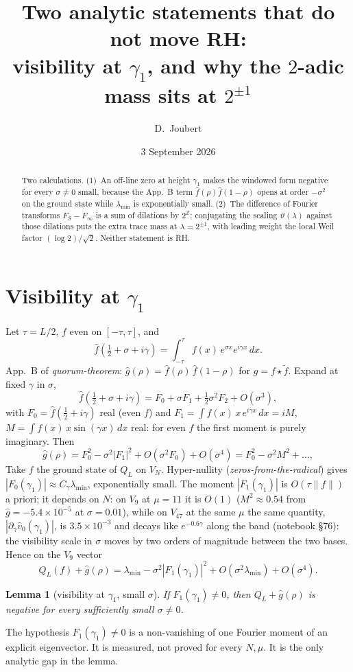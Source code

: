 \documentclass[11pt]{article}
\title{Two analytic statements that do not move RH:\\
\large visibility at $\gamma_1$, and why the $2$-adic mass sits at $2^{\pm1}$}
\author{D.\ Joubert}
\date{3 September 2026}
\newtheorem{lemma}{Lemma}
\theoremstyle{remark}\newtheorem*{remark}{Remark}
\begin{document}
\maketitle
\begin{abstract}
\noindent
Two calculations. (1)~An off-line zero at height $\gamma_1$ makes the
windowed form negative for every $\sigma\neq0$ small, because the
App.~B term $\hat f(\rho)\hat f(1-\rho)$ opens at order $-\sigma^2$
on the ground state while $\lambda_{\min}$ is exponentially small.
(2)~The difference of Fourier transforms $F_S-F_\infty$ is a sum of
dilations by $2^{\mathbb Z}$; conjugating the scaling $\vartheta(\lambda)$
against those dilations puts the extra trace mass at $\lambda=2^{\pm1}$,
with leading weight the local Weil factor $(\log2)/\sqrt2$. Neither
statement is RH.
\end{abstract}

\section{Visibility at $\gamma_1$}
Let $\tau=L/2$, $f$ even on $[-\tau,\tau]$, and
\[
\hat f(\tfrac12+\sigma+i\gamma)=\int_{-\tau}^{\tau}f(x)\,e^{\sigma x}e^{i\gamma x}\,dx.
\]
App.~B of \emph{quorum-theorem}: $\hat g(\rho)=\hat f(\rho)\,\hat f(1-\rho)$
for $g=f\star\tilde f$. Expand at fixed $\gamma$ in $\sigma$,
\[
\hat f(\tfrac12+\sigma+i\gamma)=F_0+\sigma F_1+\tfrac12\sigma^2 F_2+O(\sigma^3),
\]
with $F_0=\hat f(\tfrac12+i\gamma)$ real (even $f$) and $F_1=\int f(x)\,x\,e^{i\gamma x}\,dx=iM$, $M=\int f(x)\,x\sin(\gamma x)\,dx$ real: for even $f$ the first moment is purely imaginary.
Then
\[
\hat g(\rho)=F_0^2-\sigma^2 |F_1|^2+O(\sigma^2 F_0)+O(\sigma^4)=F_0^2-\sigma^2M^2+\ldots,
\]
Take $f$ the ground state of $Q_L$ on $V_N$. Hyper-nullity
(\emph{zeros-from-the-radical}) gives $|F_0(\gamma_1)|\approx C_\gamma\lambda_{\min}$,
exponentially small. The moment $|F_1(\gamma_1)|$ is $O(\tau\|f\|)$ a priori; it depends on $N$: on $V_9$ at $\mu=11$ it is $O(1)$ ($M^2\approx0.54$ from $\hat g=-5.4\times10^{-5}$ at $\sigma=0.01$), while on $V_{47}$ at the same $\mu$ the same quantity, $|\partial_\gamma\hat v_0(\gamma_1)|$, is $3.5\times10^{-3}$ and decays like $e^{-0.6\gamma}$ along the band (notebook \S76): the visibility scale in $\sigma$ moves by two orders of magnitude between the two bases. Hence on the $V_9$ vector
\[
Q_L(f)+\hat g(\rho)=\lambda_{\min}-\sigma^2 |F_1(\gamma_1)|^2+O(\sigma^2\lambda_{\min})+O(\sigma^4).
\]
\begin{lemma}[visibility at $\gamma_1$, small $\sigma$]
If $F_1(\gamma_1)\ne0$, then $Q_L+\hat g(\rho)$ is negative for every
sufficiently small $\sigma\neq0$.
\end{lemma}
The hypothesis $F_1(\gamma_1)\ne0$ is a non-vanishing of one Fourier
moment of an explicit eigenvector. It is measured, not proved for every
$N,\mu$. It is the only analytic gap in the lemma.
\end{document}
